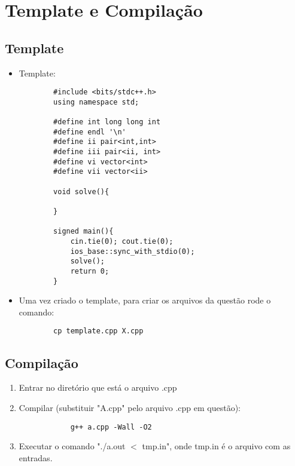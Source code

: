 
\section{Template e Compilação}
\subsection{Template}
\begin{itemize}
    \item Template:
    \begin{verbatim}
        #include <bits/stdc++.h>
        using namespace std;

        #define int long long int
        #define endl '\n'
        #define ii pair<int,int>
        #define iii pair<ii, int>
        #define vi vector<int>
        #define vii vector<ii>

        void solve(){

        }

        signed main(){
            cin.tie(0); cout.tie(0);
            ios_base::sync_with_stdio(0);
            solve();
            return 0;
        }
    \end{verbatim}
    \item Uma vez criado o template, para criar os arquivos da questão rode o comando:
    \begin{verbatim}
        cp template.cpp X.cpp
    \end{verbatim}

\end{itemize}

\subsection{Compilação}
    \begin{enumerate}
        \item Entrar no diretório que está o arquivo .cpp
        \item Compilar (substituir "A.cpp" pelo arquivo .cpp em questão): 
        \begin{verbatim}
            g++ a.cpp -Wall -O2
        \end{verbatim}
        \item Executar o comando "./a.out $<$ tmp.in", onde tmp.in é o arquivo com as entradas.
    \end{enumerate}
\pagebreak

